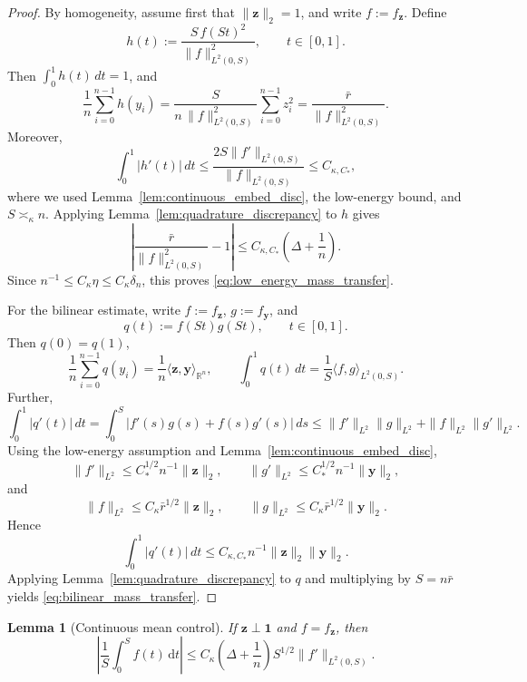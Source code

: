 \documentclass[11pt]{article}
\numberwithin{equation}{section}
\newtheorem{lemma}[theorem]{Lemma}
\theoremstyle{definition}
\theoremstyle{remark}
\begin{document}
\begin{proof}
	By homogeneity, assume first that $\|\boldsymbol{z}\|_2=1$, and write
	$f:=f_{\boldsymbol{z}}$. Define
	\[
	h(t):=\frac{S\,f(St)^2}{\|f\|_{L^2(0,S)}^2},
	\qquad t\in[0,1].
	\]
	Then $\int_0^1 h(t)\,dt=1$, and
	\[
	\frac1n\sum_{i=0}^{n-1}h(y_i)
	=
	\frac{S}{n\,\|f\|_{L^2(0,S)}^2}\sum_{i=0}^{n-1}z_i^2
	=
	\frac{\bar r}{\|f\|_{L^2(0,S)}^2}.
	\]
	Moreover,
	\[
	\int_0^1|h'(t)|\,dt
	\le
	\frac{2S\|f'\|_{L^2(0,S)}}{\|f\|_{L^2(0,S)}}
	\le C_{\kappa,C_*},
	\]
	where we used Lemma~\ref{lem:continuous_embed_disc}, the low-energy bound,
	and $S\asymp_\kappa n$. Applying
	Lemma~\ref{lem:quadrature_discrepancy} to $h$ gives
	\[
	\left|
	\frac{\bar r}{\|f\|_{L^2(0,S)}^2}-1
	\right|
	\le
	C_{\kappa,C_*}\left(\Delta+\frac1n\right).
	\]
	Since $n^{-1}\le C_\kappa \eta\le C_\kappa\delta_n$, this proves
	\eqref{eq:low_energy_mass_transfer}.
	
	For the bilinear estimate, write $f:=f_{\boldsymbol{z}}$,
	$g:=f_{\boldsymbol{y}}$, and
	\[
	q(t):=f(St)g(St),\qquad t\in[0,1].
	\]
	Then $q(0)=q(1)$,
	\[
	\frac1n\sum_{i=0}^{n-1}q(y_i)
	=
	\frac1n\langle\boldsymbol{z},\boldsymbol{y}\rangle_{\mathbb{R}^n},
	\qquad
	\int_0^1q(t)\,dt
	=
	\frac1S\langle f,g\rangle_{L^2(0,S)}.
	\]
	Further,
	\[
	\int_0^1|q'(t)|\,dt
	=
	\int_0^S|f'(s)g(s)+f(s)g'(s)|\,ds
	\le
	\|f'\|_{L^2}\|g\|_{L^2}+\|f\|_{L^2}\|g'\|_{L^2}.
	\]
	Using the low-energy assumption and
	Lemma~\ref{lem:continuous_embed_disc},
	\[
	\|f'\|_{L^2}\le C_*^{1/2}n^{-1}\|\boldsymbol{z}\|_2,
	\qquad
	\|g'\|_{L^2}\le C_*^{1/2}n^{-1}\|\boldsymbol{y}\|_2,
	\]
	and
	\[
	\|f\|_{L^2}\le C_\kappa \bar r^{1/2}\|\boldsymbol{z}\|_2,
	\qquad
	\|g\|_{L^2}\le C_\kappa \bar r^{1/2}\|\boldsymbol{y}\|_2.
	\]
	Hence
	\[
	\int_0^1|q'(t)|\,dt
	\le
	C_{\kappa,C_*}n^{-1}\|\boldsymbol{z}\|_2\|\boldsymbol{y}\|_2.
	\]
	Applying Lemma~\ref{lem:quadrature_discrepancy} to $q$ and multiplying
	by $S=n\bar r$ yields \eqref{eq:bilinear_mass_transfer}.
\end{proof}

\begin{lemma}[Continuous mean control]\label{lem:continuous_mean_control}
	If $\boldsymbol{z}\perp\boldsymbol{1}$ and $f=f_{\boldsymbol{z}}$, then
	\begin{equation}\label{eq:continuous_mean_control}
		\left|\frac1S\int_0^Sf(t)\,\mathrm dt\right|
		\le
		C_\kappa\left(\Delta+\frac1n\right)S^{1/2}\|f'\|_{L^2(0,S)}.
	\end{equation}
\end{lemma}
\end{document}
